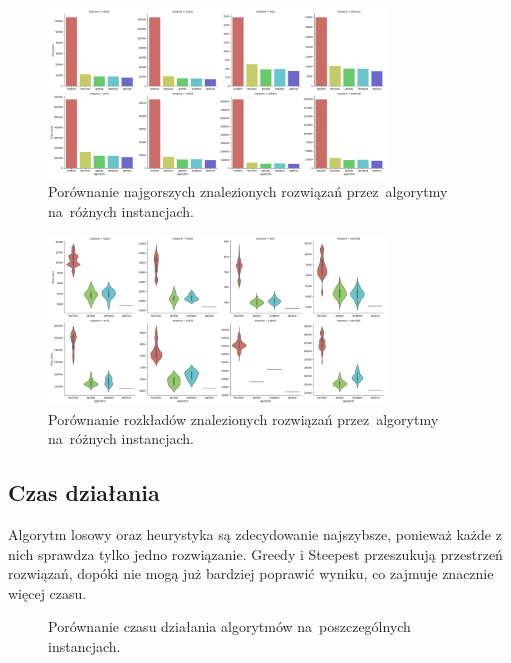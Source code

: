 \begin{figure}
\begin{center}
\includegraphics[width=0.8\textwidth]{graphs/algorithm_score_comparison_bar_max.png}
\end{center}
\caption{Porównanie najgorszych znalezionych rozwiązań przez~algorytmy na~różnych instancjach.}
\label{fig:worst}
\end{figure}

\begin{figure}
\begin{center}
\includegraphics[width=0.8\textwidth]{graphs/algorithm_score_comparison_violin.png}
\end{center}
\caption{Porównanie rozkładów znalezionych rozwiązań przez~algorytmy na~różnych instancjach.}
\label{fig:distribution}
\end{figure}

\subsection{Czas działania}

Algorytm losowy oraz heurystyka są zdecydowanie najszybsze, ponieważ każde z nich sprawdza tylko jedno rozwiązanie. Greedy i Steepest przeszukują przestrzeń rozwiązań, dopóki nie mogą już bardziej poprawić wyniku, co zajmuje znacznie więcej czasu.

\begin{figure}
\begin{center}
\end{center}
\caption{Porównanie czasu działania algorytmów na~poszczególnych instancjach.}
\label{fig:best}
\end{figure}

